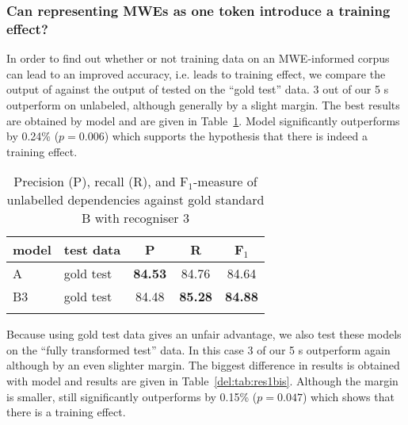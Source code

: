 \documentclass[output=paper]{langsci/langscibook}
\begin{document}
\subsubsection{Can representing MWEs as one token introduce a training effect?}

\indent In order to find out whether or not training data on an MWE-informed corpus can lead to an improved accuracy, i.e. leads to training effect, we compare the output of {\modelB} against the output of {\modelA} tested on the ``gold test'' data. 3 out of our 5 {\modelB}s outperform {\modelA} on unlabeled, although generally by a slight margin. The best results are obtained by model and are given in Table~\ref{del:tab:res1}. Model significantly outperforms {\modelA} by 0.24\% ($p=0.006$) which supports the hypothesis that there is indeed a training effect.

\begin{table}[h]
    \centering
    \begin{tabular}{l l c c c} %
      \lsptoprule
        \textnormal{model}
        & \textnormal{test data}
        & \textnormal{P}
        & \textnormal{R}
        & \textnormal{F$_1$}
        \\ %
        \midrule
        A & gold test &\textbf{84.53}  &84.76 &84.64 \\
        B3 & gold test &84.48  &\textbf{85.28}  &\textbf{84.88} \tabularnewline %
        \lspbottomrule
    \end{tabular}
    \caption{Precision (P), recall (R), and F$_1$-measure of unlabelled dependencies against gold standard B with recogniser 3 \label{del:tab:res1}}
\end{table}

\indent Because using gold test data gives {\modelB} an unfair advantage, we also test these models on the ``fully transformed test'' data. In this case 3 of our 5 {\modelB}s outperform {\modelA} again although by an even slighter margin. The biggest difference in results is obtained with model and results are given in Table~\ref{del:tab:res1bis}. Although the margin is smaller, {\modelB} still significantly outperforms {\modelA} by 0.15\% ($p=0.047$) which shows that there is a training effect.
\end{document}
